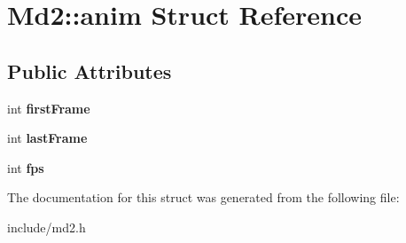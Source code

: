 \hypertarget{structMd2_1_1anim}{\section{Md2\-:\-:anim Struct Reference}
\label{structMd2_1_1anim}
}
\subsection*{Public Attributes}
\begin{DoxyCompactItemize}
\item 
\hypertarget{structMd2_1_1anim_ab5cdd291100a651d10b226fb110d9019}{int {\bfseries first\-Frame}}\label{structMd2_1_1anim_ab5cdd291100a651d10b226fb110d9019}

\item 
\hypertarget{structMd2_1_1anim_a1b19daf0390e5b2b8c78da0d02d44256}{int {\bfseries last\-Frame}}\label{structMd2_1_1anim_a1b19daf0390e5b2b8c78da0d02d44256}

\item 
\hypertarget{structMd2_1_1anim_ace8e78fd310a5209108a440bfb983493}{int {\bfseries fps}}\label{structMd2_1_1anim_ace8e78fd310a5209108a440bfb983493}

\end{DoxyCompactItemize}


The documentation for this struct was generated from the following file\-:\begin{DoxyCompactItemize}
\item 
include/md2.\-h\end{DoxyCompactItemize}
